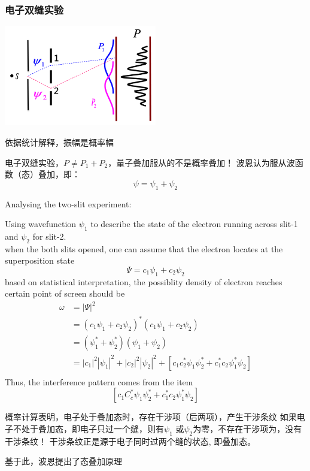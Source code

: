 \begin{frame}
    \frametitle{电子双缝实验}
    \begin{center}
        \includegraphics[width=0.5\textwidth]{figs/sup-3.png} \\
    \end{center} 
    依据统计解释，振幅是概率幅\\
    \begin{itemize}
        \Item 电子双缝实验，$P\neq P_1+P_2 $，量子叠加服从的不是概率叠加！
        \Item 波恩认为服从波函数（态）叠加，即：
        $$ \psi =\psi_1+\psi_2$$
    \end{itemize}
\end{frame} 


\begin{frame} [allowframebreaks=]
    Analysing the two-slit experiment:\\
    \begin{itemize}
        \Item Using wavefunction $\psi_1$ to describe the state of the electron running across slit-1 and $\psi_2$ for slit-2. \\
        \Item when the both slits opened, one can assume that the electron locates at the superposition state
            \[ \Psi=c_1 \psi_1+ c_2\psi_2 \]
        \Item based on statistical interpretation, the possiblity density of electron reaches certain point of screen should be
        \begin{equation*}
        \begin{split}
            \omega &=|\Psi|^2 \\
            &= (c_1 \psi_1+ c_2\psi_2)^* (c_1 \psi_1+ c_2\psi_2) \\
            &=(\psi_1^*+\psi_2^*)(\psi_1+\psi_2) \\ 
            & = |c_1|^2 |\psi_1|^2 + |c_2|^2 |\psi_2|^2  + [c_1 c_2 ^* \psi_1 \psi_2 ^* + c_1 ^* c_2 \psi_1 ^* \psi_2] \\
        \end{split} 
        \end{equation*}
        \Item Thus, the interference pattern comes from the item  
        \[[c_1 C_c ^* \psi_1 \psi_2 ^* + c_1 ^* c_2 \psi_1 ^* \psi_2] \]
    \end{itemize}
    \begin{itemize}
        \Item 概率计算表明，电子处于叠加态时，存在干涉项（后两项），产生干涉条纹
        \Item 如果电子不处于叠加态，即电子只过一个缝，则有$\psi_1$ 或$\psi_2$为零，不存在干涉项为，没有干涉条纹！
        \Item 干涉条纹正是源于电子同时过两个缝的状态, 即叠加态。
    \end{itemize}
    基于此，波恩提出了态叠加原理
\end{frame}

